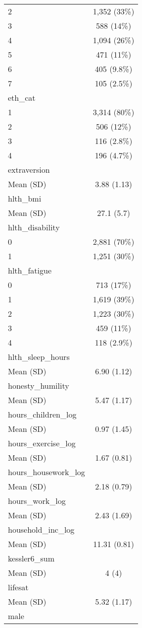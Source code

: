 \documentclass[
  singlecolumn,
  9pt]{article}
\begin{document}
\begin{table}
{\begin{longtable}[]{@{}lc@{}}
2 & 1,352 (33\%) \\
3 & 588 (14\%) \\
4 & 1,094 (26\%) \\
5 & 471 (11\%) \\
6 & 405 (9.8\%) \\
7 & 105 (2.5\%) \\
eth\_cat & \\
1 & 3,314 (80\%) \\
2 & 506 (12\%) \\
3 & 116 (2.8\%) \\
4 & 196 (4.7\%) \\
extraversion & \\
Mean (SD) & 3.88 (1.13) \\
hlth\_bmi & \\
Mean (SD) & 27.1 (5.7) \\
hlth\_disability & \\
0 & 2,881 (70\%) \\
1 & 1,251 (30\%) \\
hlth\_fatigue & \\
0 & 713 (17\%) \\
1 & 1,619 (39\%) \\
2 & 1,223 (30\%) \\
3 & 459 (11\%) \\
4 & 118 (2.9\%) \\
hlth\_sleep\_hours & \\
Mean (SD) & 6.90 (1.12) \\
honesty\_humility & \\
Mean (SD) & 5.47 (1.17) \\
hours\_children\_log & \\
Mean (SD) & 0.97 (1.45) \\
hours\_exercise\_log & \\
Mean (SD) & 1.67 (0.81) \\
hours\_housework\_log & \\
Mean (SD) & 2.18 (0.79) \\
hours\_work\_log & \\
Mean (SD) & 2.43 (1.69) \\
household\_inc\_log & \\
Mean (SD) & 11.31 (0.81) \\
kessler6\_sum & \\
Mean (SD) & 4 (4) \\
lifesat & \\
Mean (SD) & 5.32 (1.17) \\
male & \\

\end{longtable}}
\end{table}
\end{document}
